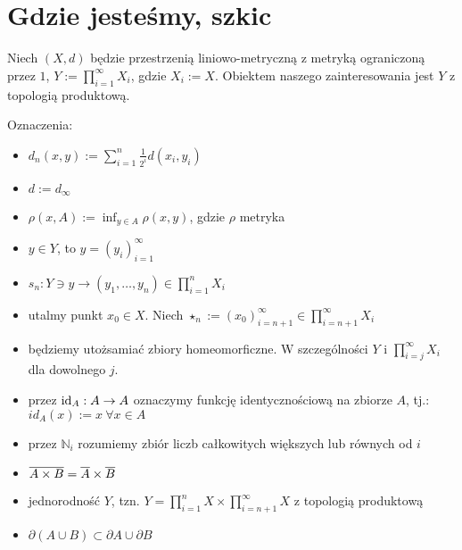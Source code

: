\section{Gdzie jesteśmy, szkic}
Niech $(X, d)$ będzie przestrzenią liniowo-metryczną z metryką ograniczoną przez $1$, $Y := \prod_{i=1}^{\infty} X_i$, gdzie $X_i := X$. Obiektem naszego zainteresowania jest $Y$ z topologią produktową.

Oznaczenia:
\begin{itemize}
  \item $d_n(x, y) := \sum_{i=1}^n \frac{1}{2^i} d(x_i, y_i)$
  \item $d := d_\infty$
  \item $\rho(x, A) := \inf_{y \in A} \rho(x, y)$, gdzie $\rho$ metryka
  \item $y \in Y$, to $y = (y_i)_{i=1}^\infty$
  \item $s_n: Y \ni y \rightarrow (y_1, \ldots, y_n) \in \prod_{i=1}^{n} X_i$
  \item utalmy punkt $x_0 \in X$. Niech $\star_n := (x_0)_{i=n+1}^\infty \in \prod_{i=n+1}^\infty X_i$
  \item będziemy utożsamiać zbiory homeomorficzne. W szczególności $Y$ i $\prod_{i=j}^\infty X_i$ dla dowolnego $j$.
  \item przez $\mbox{id}_A: A \rightarrow A$ oznaczymy funkcję identycznościową na zbiorze $A$, tj.: $id_A(x) := x\ \forall x \in A$
  \item przez $\mathbb{N}_i$  rozumiemy zbiór liczb całkowitych większych lub równych od $i$
\end{itemize}

\begin{note} \mbox{} %
\begin{itemize}
  \item $\overline{A \times B} = \overline{A} \times \overline{B}$
  \item jednorodność $Y$, tzn. $Y = \prod_{i=1}^n X \times \prod_{i=n+1}^\infty X$ z topologią produktową
  \item $\partial(A \cup B) \subset \partial A \cup \partial B$
\end{itemize}
\end{note}
